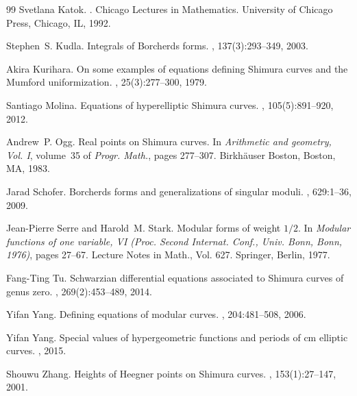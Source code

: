 \documentclass{amsart}
\theoremstyle{definition}
\begin{document}
\begin{thebibliography}{99}
Svetlana Katok.
.
\newblock Chicago Lectures in Mathematics. University of Chicago Press,
  Chicago, IL, 1992.

Stephen~S. Kudla.
\newblock Integrals of {B}orcherds forms.
, 137(3):293--349, 2003.

Akira Kurihara.
\newblock On some examples of equations defining {S}himura curves and the
  {M}umford uniformization.
, 25(3):277--300, 1979.

Santiago Molina.
\newblock Equations of hyperelliptic {S}himura curves.
, 105(5):891--920, 2012.

Andrew~P. Ogg.
\newblock Real points on {S}himura curves.
\newblock In {\em Arithmetic and geometry, {V}ol. {I}}, volume~35 of {\em
  Progr. Math.}, pages 277--307. Birkh\"auser Boston, Boston, MA, 1983.

Jarad Schofer.
\newblock Borcherds forms and generalizations of singular moduli.
, 629:1--36, 2009.

Jean-Pierre Serre and Harold~M. Stark.
\newblock Modular forms of weight {$1/2$}.
\newblock In {\em Modular functions of one variable, {VI} ({P}roc. {S}econd
  {I}nternat. {C}onf., {U}niv. {B}onn, {B}onn, 1976)}, pages 27--67. Lecture
  Notes in Math., Vol. 627. Springer, Berlin, 1977.

Fang-Ting Tu.
\newblock Schwarzian differential equations associated to {S}himura curves of
  genus zero.
, 269(2):453--489, 2014.

Yifan Yang.
\newblock Defining equations of modular curves.
, 204:481--508, 2006.

Yifan Yang.
\newblock Special values of hypergeometric functions and periods of cm elliptic
  curves.
, 2015.

Shouwu Zhang.
\newblock Heights of {H}eegner points on {S}himura curves.
, 153(1):27--147, 2001.

\end{thebibliography}
\end{document}
